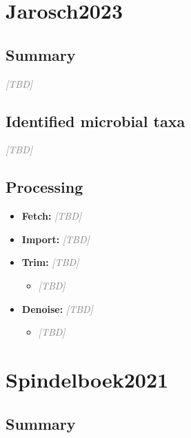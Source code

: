\documentclass[11pt,a4paper]{article}
\newcommand{\tbd}{\textcolor{gray}{\emph{[TBD]}}}
\begin{document}
\section{Jarosch2023}
\subsection{Summary}
\tbd

\subsection{Identified microbial taxa}
\tbd

\subsection{Processing}
\begin{itemize}
\item \textbf{Fetch:} \tbd
\item \textbf{Import:} \tbd
\item \textbf{Trim:} \tbd
  \begin{itemize}
  \item \tbd
  \end{itemize}
\item \textbf{Denoise:} \tbd
  \begin{itemize}
  \item \tbd
  \end{itemize}
\end{itemize}

\section{Spindelboek2021}
\subsection{Summary}
\end{document}
